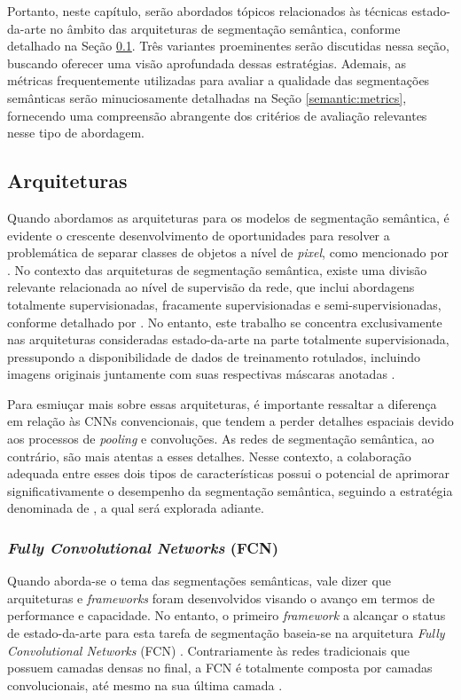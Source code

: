 Portanto, neste capítulo, serão abordados tópicos relacionados às técnicas estado-da-arte no âmbito das arquiteturas de segmentação semântica, conforme detalhado na Seção \ref{semantic:arch}. Três variantes proeminentes serão discutidas nessa seção, buscando oferecer uma visão aprofundada dessas estratégias. Ademais, as métricas frequentemente utilizadas para avaliar a qualidade das segmentações semânticas serão minuciosamente detalhadas na Seção \ref{semantic:metrics}, fornecendo uma compreensão abrangente dos critérios de avaliação relevantes nesse tipo de abordagem.

\subsection{Arquiteturas}
\label{semantic:arch}
Quando abordamos as arquiteturas para os modelos de segmentação semântica, é evidente o crescente desenvolvimento de oportunidades para resolver a problemática de separar classes de objetos a nível de \textit{pixel}, como mencionado por \cite{Guo2018ANetworks}. No contexto das arquiteturas de segmentação semântica, existe uma divisão relevante relacionada ao nível de supervisão da rede, que inclui abordagens totalmente supervisionadas, fracamente supervisionadas e semi-supervisionadas, conforme detalhado por \cite{Hao2020ALearning}. No entanto, este trabalho se concentra exclusivamente nas arquiteturas consideradas estado-da-arte na parte totalmente supervisionada, pressupondo a disponibilidade de dados de treinamento rotulados, incluindo imagens originais juntamente com suas respectivas máscaras anotadas \citep{Hao2020ALearning}.

Para esmiuçar mais sobre essas arquiteturas, é importante ressaltar a diferença em relação às CNNs convencionais, que tendem a perder detalhes espaciais devido aos processos de \textit{pooling} e convoluções. As redes de segmentação semântica, ao contrário, são mais atentas a esses detalhes. Nesse contexto, a colaboração adequada entre esses dois tipos de características possui o potencial de aprimorar significativamente o desempenho da segmentação semântica, seguindo a estratégia denominada de , a qual será explorada adiante.

\subsubsection{\textit{Fully Convolutional Networks} (FCN)}
\label{semantic:FCN}
Quando aborda-se o tema das segmentações semânticas, vale dizer que arquiteturas e \textit{frameworks} foram desenvolvidos visando o avanço em termos de performance e capacidade. No entanto, o primeiro \textit{framework} a alcançar o status de estado-da-arte para esta tarefa de segmentação baseia-se na arquitetura  \textit{Fully Convolutional Networks} (FCN) \citep{Shelhamer2016}. Contrariamente às redes tradicionais que possuem camadas densas no final, a FCN é totalmente composta por camadas convolucionais, até mesmo na sua última camada \citep{Hesamian2019}.

